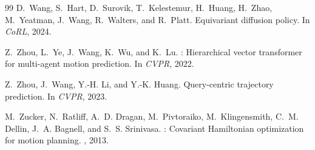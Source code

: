 \documentclass[conference]{IEEEtran}
\begin{document}
\begin{thebibliography}{99}
D.~Wang, S.~Hart, D.~Surovik, T.~Kelestemur, H.~Huang, H.~Zhao, M.~Yeatman,
  J.~Wang, R.~Walters, and R.~Platt.
\newblock Equivariant diffusion policy.
\newblock In {\em CoRL}, 2024.

Z.~Zhou, L.~Ye, J.~Wang, K.~Wu, and K.~Lu.
: Hierarchical vector transformer for multi-agent motion
  prediction.
\newblock In {\em CVPR}, 2022.

Z.~Zhou, J.~Wang, Y.-H. Li, and Y.-K. Huang.
\newblock Query-centric trajectory prediction.
\newblock In {\em CVPR}, 2023.

M.~Zucker, N.~Ratliff, A.~D. Dragan, M.~Pivtoraiko, M.~Klingensmith, C.~M.
  Dellin, J.~A. Bagnell, and S.~S. Srinivasa.
: Covariant Hamiltonian optimization for motion planning.
, 2013.

\end{thebibliography}
\end{document}
